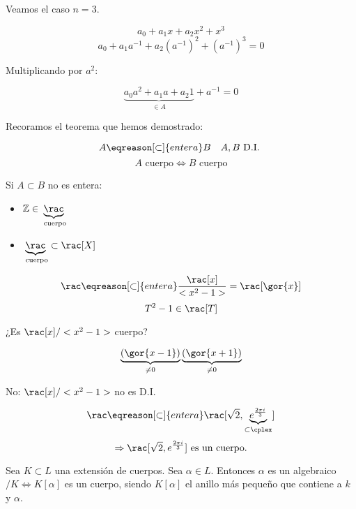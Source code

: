 	\begin{example}
		Veamos el caso $n = 3$.

		\[ a_0 + a_1 x + a_2 x^2 + x^3 \]
		\[ a_0 + a_1 a^{-1} + a_2 (a^{-1})^2  + (a^{-1})^3 = 0 \]

		Multiplicando por $a^2$:

		\[ \underbrace{a_0 a^2 + a_1 a + a_2 1}_{\in A} + a^{-1} = 0\]
	\end{example}

	Recoramos el teorema que hemos demostrado:

	\[ A \eqreason[\subset]{entera} B \quad A,B \text{ D.I. }\]
	\[ A \text{ cuerpo} \Leftrightarrow B \text{ cuerpo} \]

	\begin{example}[1]
		Si $A \subset B$ no es entera:
		\begin{itemize}
			\item $\mathbb{Z} \in \underbrace{\rac}_{\text{ cuerpo}}$
			\item $\underbrace{\rac}_{\text{ cuerpo}} \subset \rac[X]$
		\end{itemize}
	\end{example}

	\begin{example}[2]
		\[ \rac \eqreason[\subset]{entera} \frac{\rac[x]}{<x^2-1>} = \rac[\gor{x}] \]
		\[ T^2 - 1 \in \rac[T] \]

		¿Es $\rac[x]/<x^2-1>$ cuerpo?

		\[ \underbrace{(\gor{x-1})}_{\neq 0} \underbrace{(\gor{x+1})}_{\neq 0} \]

		No: $\rac[x]/<x^2-1>$ no es D.I.
	\end{example}

	\begin{example}[3]
		\[ \rac \eqreason[\subset]{entera} \rac[\sqrt{2}, \underbrace{e^{\frac{2\pi i}{3}}}_{\subset \cplex}] \]
		\[ \Rightarrow \rac[\sqrt{2}, e^{\frac{2\pi i}{3}}] \text{ es un cuerpo.}\]
	\end{example}

	\begin{corol}
		Sea $K \subset L$ una extensión de cuerpos. Sea $\alpha \in L$. Entonces $\alpha$ es un algebraico$/K \Leftrightarrow K[\alpha]$ es un cuerpo, siendo $K[\alpha]$ el anillo más pequeño que contiene a $k$ y $\alpha$.
	\end{corol}

